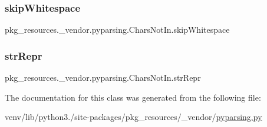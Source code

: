 \subsubsection{\texorpdfstring{skip\+Whitespace}{skipWhitespace}}
{\footnotesize\ttfamily pkg\+\_\+resources.\+\_\+vendor.\+pyparsing.\+Chars\+Not\+In.\+skip\+Whitespace}

\mbox{\label{classpkg__resources_1_1__vendor_1_1pyparsing_1_1CharsNotIn_afae503e6fb98db119a00caa626ecf909}} 
\subsubsection{\texorpdfstring{str\+Repr}{strRepr}}
{\footnotesize\ttfamily pkg\+\_\+resources.\+\_\+vendor.\+pyparsing.\+Chars\+Not\+In.\+str\+Repr}



The documentation for this class was generated from the following file\+:\begin{DoxyCompactItemize}
\item 
venv/lib/python3./site-\/packages/pkg\+\_\+resources/\+\_\+vendor/\hyperlink{pkg__resources_2__vendor_2pyparsing_8py}{pyparsing.\+py}\end{DoxyCompactItemize}

